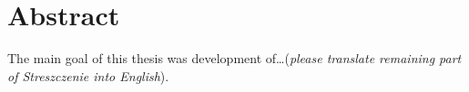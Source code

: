 \chapter*{Abstract} %
The main goal of this thesis was development of\dots (\textit{please translate remaining part of Streszczenie into English}).

